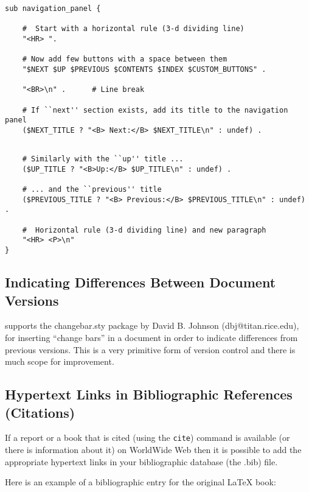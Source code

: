 \begin{small}
\begin{verbatim}
sub navigation_panel {

    #  Start with a horizontal rule (3-d dividing line)
    "<HR> ".			
    
    # Now add few buttons with a space between them
    "$NEXT $UP $PREVIOUS $CONTENTS $INDEX $CUSTOM_BUTTONS" .
	    
    "<BR>\n" .		# Line break
	
    # If ``next'' section exists, add its title to the navigation panel
    ($NEXT_TITLE ? "<B> Next:</B> $NEXT_TITLE\n" : undef) . 
    
\end{verbatim}
\begin{verbatim}
    # Similarly with the ``up'' title ...
    ($UP_TITLE ? "<B>Up:</B> $UP_TITLE\n" : undef) . 
 
    # ... and the ``previous'' title
    ($PREVIOUS_TITLE ? "<B> Previous:</B> $PREVIOUS_TITLE\n" : undef) .
   
    #  Horizontal rule (3-d dividing line) and new paragraph  
    "<HR> <P>\n"		
}
\end{verbatim}
\end{small}

\subsection{Indicating Differences Between Document Versions} 

\latextohtml supports the {\fn changebar.sty} package by David B. Johnson 
(dbj@titan.rice.edu), for 
inserting ``change bars'' in a document in order to indicate 
differences from previous versions. This is a very primitive form of 
version control and there is much scope for improvement.


\subsection{Hypertext Links in Bibliographic References (Citations)}
If a report or a book that is cited (using the {\tt cite}) 
command is available (or there is information about it) on WorldWide
Web then it is possible to add the appropriate hypertext links
in your bibliographic database (the {\fn .bib}) file. 

Here is an example of a bibliographic entry for the original
LaTeX\cite{lamp:latex} book:

